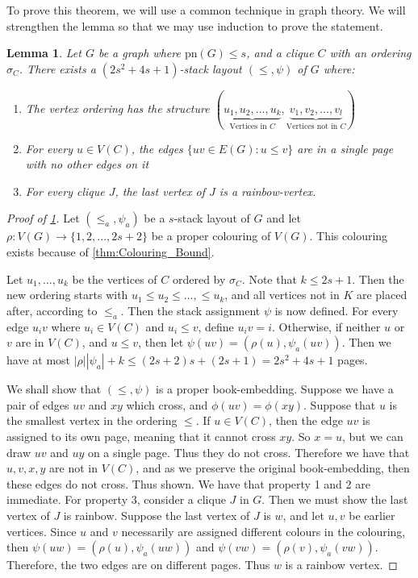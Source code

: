 \documentclass[]{article}
\newcommand{\pn}{\text{pn}}
\newtheorem{lemma}[theorem]{Lemma}
\theoremstyle{definition}
\numberwithin{theorem}{section}
\numberwithin{equation}{section}
\begin{document}
To prove this theorem, we will use a common technique in graph theory. We will strengthen the lemma so that we may use induction to prove the statement.
\begin{lemma}\label{lem:Hickingbotham_Lemma}
	Let $G$ be a graph where $\pn(G) \leq s$, and a clique $C$ with an ordering $\sigma_C$. There exists a $(2s^2 + 4s + 1)$-stack layout $(\leq, \psi)$ of $G$ where:
	\begin{enumerate}
		\item The vertex ordering has the structure $(\underbrace{u_1, u_2, ..., u_k}_{\text{Vertices in } C}, \underbrace{v_1, v_2, ..., v_l}_{\text{Vertices not in }C})$
		\item For every $u \in V(C)$, the edges $\lbrace uv \in E(G) : u \leq v \rbrace$ are in a single page with no other edges on it
		\item For every clique $J$, the last vertex of $J$ is a rainbow-vertex. 
	\end{enumerate}
\end{lemma}
\begin{proof}[Proof of \cref{lem:Hickingbotham_Lemma}]
	Let $(\leq_a, \psi_a)$ be a $s$-stack layout of $G$ and let $\rho: V(G) \rightarrow \lbrace 1, 2, ..., 2s + 2 \rbrace$ be a proper colouring of $V(G)$. This colouring exists because of \cref{thm:Colouring_Bound}.

Let $u_1, ..., u_k$ be the vertices of $C$ ordered by $\sigma_C$. Note that $k \leq 2s + 1$. Then the new ordering starts with $u_1 \leq u_2 \leq ..., \leq u_k$, and all vertices not in $K$ are placed after, according to $\leq_a$.
Then the stack assignment $\psi$ is now defined. For every edge $u_i v$ where $u_i \in V(C)$ and $u_i \leq v$, define $u_i v = i$. Otherwise, if neither $u$ or $v$ are in $V(C)$, and $u \leq v$, then let $\psi(uv) = (\rho(u), \psi_a(uv))$. Then we have at most $|\rho| |\psi_a| + k \leq (2s + 2) s + (2s + 1) = 2s^2 + 4s + 1$ pages.

We shall show that $(\leq, \psi)$ is a proper book-embedding. Suppose we have a pair of edges $uv$ and $xy$ which cross, and $\phi(uv) = \phi(xy)$. Suppose that $u$ is the smallest vertex in the ordering $\leq$. If $u \in V(C)$, then the edge $uv$ is assigned to its own page, meaning that it cannot cross $xy$. So $x = u$, but we can draw $uv$ and $uy$ on a single page. Thus they do not cross. Therefore we have that $u, v, x, y$ are not in $V(C)$, and as we preserve the original book-embedding, then these edges do not cross. Thus shown.
We have that property 1 and 2 are immediate. For property 3, consider a clique $J$ in $G$. Then we must show the last vertex of $J$ is rainbow. Suppose the last vertex of $J$ is $w$, and let $u, v$ be earlier vertices. Since $u$ and $v$ necessarily are assigned different colours in the colouring, then $\psi(uw) = (\rho(u), \psi_a(uw))$ and $\psi(vw) = (\rho(v), \psi_a(vw))$. Therefore, the two edges are on different pages. Thus $w$ is a rainbow vertex. 
\end{proof}
\end{document}
